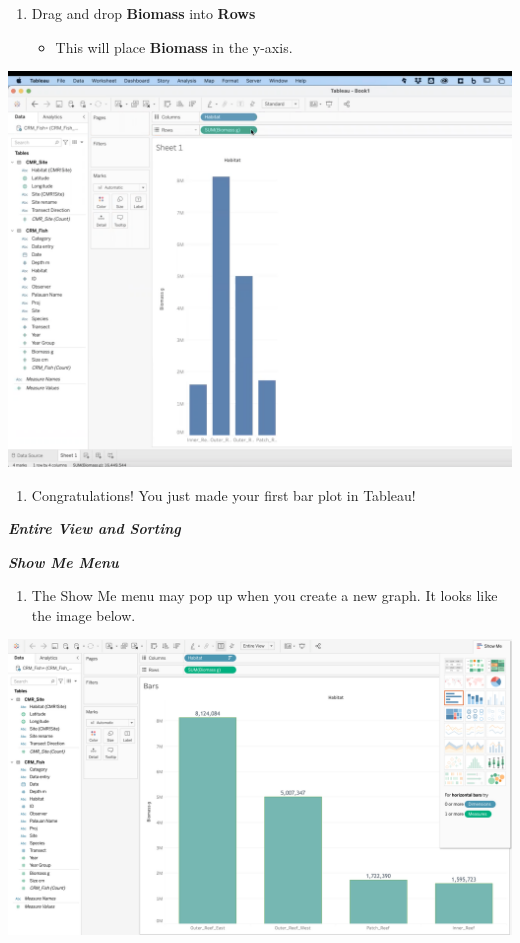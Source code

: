 \documentclass[
]{book}
\providecommand{\tightlist}{%
  \setlength{\itemsep}{0pt}\setlength{\parskip}{0pt}}
\begin{document}
\begin{enumerate}
\def\labelenumi{\arabic{enumi}.}
\setcounter{enumi}{3}
\tightlist
\item
  Drag and drop \textbf{Biomass} into \textbf{Rows}

  \begin{itemize}
  \tightlist
  \item
    This will place \textbf{Biomass} in the y-axis.
  \end{itemize}
\end{enumerate}

\includegraphics{images/M3S2_drag-biomass.png}

\begin{enumerate}
\def\labelenumi{\arabic{enumi}.}
\setcounter{enumi}{4}
\tightlist
\item
  Congratulations! You just made your first bar plot in Tableau!
\end{enumerate}

\textbf{\emph{Entire View and Sorting }}

\textbf{\emph{Show Me Menu}}

\begin{enumerate}
\def\labelenumi{\arabic{enumi}.}
\tightlist
\item
  The Show Me menu may pop up when you create a new graph. It looks like the image below.
\end{enumerate}

\includegraphics{images/M3S2_show-me-menu-full.png}
\end{document}

